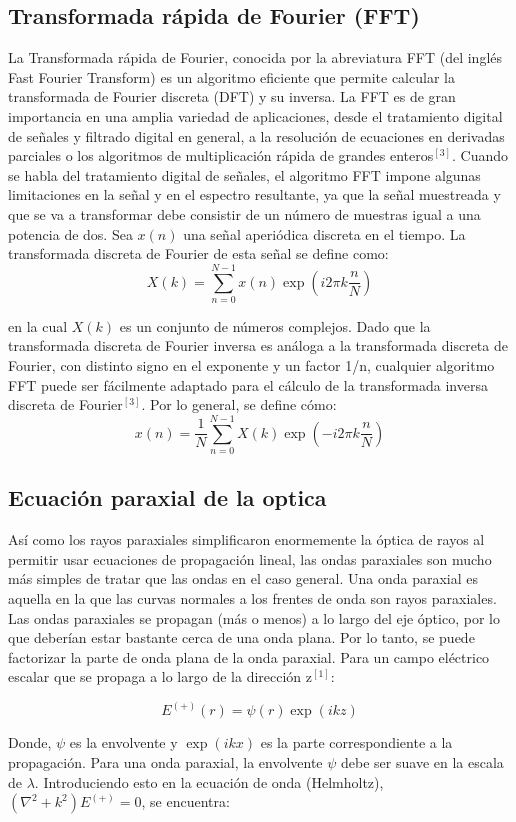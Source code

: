 \documentclass[11pt,letterpaper,twocolumn]{article}
\begin{document}
\subsection*{Transformada rápida de Fourier (FFT)}
La Transformada rápida de Fourier, conocida por la abreviatura FFT (del inglés Fast Fourier Transform) es un algoritmo eficiente que permite calcular la transformada de Fourier discreta (DFT) y su inversa. La FFT es de gran importancia en una amplia variedad de aplicaciones, desde el tratamiento digital de señales y filtrado digital en general, a la resolución de ecuaciones en derivadas parciales o los algoritmos de multiplicación rápida de grandes enteros$^{[3]}$. Cuando se habla del tratamiento digital de señales, el algoritmo FFT impone algunas limitaciones en la señal y en el espectro resultante, ya que la señal muestreada y que se va a transformar debe consistir de un número de muestras igual a una potencia de dos. Sea $x(n)$ una señal aperiódica discreta en el tiempo. La transformada discreta de Fourier de esta señal se define como: 
$$X(k)= \sum_{n=0}^{N-1} x(n) \exp(i2 \pi k\dfrac{n}{N})$$
\par 
en la cual $X(k)$ es un conjunto de números complejos. Dado que la transformada discreta de Fourier inversa es análoga a la transformada discreta de Fourier, con distinto signo en el exponente y un factor 1/n, cualquier algoritmo FFT puede ser fácilmente adaptado para el cálculo de la transformada inversa discreta de Fourier$^{[3]}$. Por lo general, se define cómo:
$$x(n)= \dfrac{1}{N} \sum_{n=0}^{N-1} X(k) \exp(- i2 \pi k\dfrac{n}{N})$$
\subsection*{Ecuación paraxial de la optica}
Así como los rayos paraxiales simplificaron enormemente la óptica de rayos al permitir usar ecuaciones de propagación lineal, las ondas paraxiales son mucho más simples de tratar que las ondas en el caso general. Una onda paraxial es aquella en la que las curvas normales a los frentes de onda son rayos paraxiales. Las ondas paraxiales se propagan (más o menos) a lo largo del eje óptico, por lo que deberían estar bastante cerca de una onda plana. Por lo tanto, se puede factorizar la parte de onda plana de la onda paraxial. Para un campo eléctrico escalar que se propaga a lo largo de la dirección z$^{[1]}$:

$$E^{(+)}(r)=\psi(r)\exp(ikz) $$ 
\par 
Donde, $\psi$ es la envolvente y $\exp(ikx)$ es la parte correspondiente a la propagación. Para una onda paraxial, la envolvente $\psi$ debe ser suave en la escala de $\lambda$. Introduciendo esto en la ecuación de onda (Helmholtz), $(\nabla^{2}+k^{2})E^{(+)}=0$, se encuentra:\\
 
\end{document}
